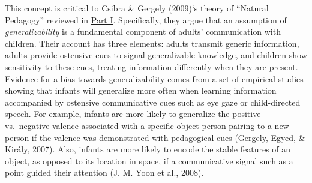 \documentclass[oneside]{report}
\begin{document}
This concept is critical to Csibra \& Gergely (2009)`s theory of
``Natural Pedagogy'' reviewed in \protect\hyperlink{p1}{Part I}.
Specifically, they argue that an assumption of \emph{generalizability}
is a fundamental component of adults' communication with children. Their
account has three elements: adults transmit generic information, adults
provide ostensive cues to signal generalizable knowledge, and children
show sensitivity to these cues, treating information differently when
they are present. Evidence for a bias towards generalizability comes
from a set of empirical studies showing that infants will generalize
more often when learning information accompanied by ostensive
communicative cues such as eye gaze or child-directed speech. For
example, infants are more likely to generalize the positive vs.~negative
valence associated with a specific object-person pairing to a new person
if the valence was demonstrated with pedagogical cues (Gergely, Egyed,
\& Király, 2007). Also, infants are more likely to encode the stable
features of an object, as opposed to its location in space, if a
communicative signal such as a point guided their attention (J. M. Yoon
et al., 2008).
\end{document}
